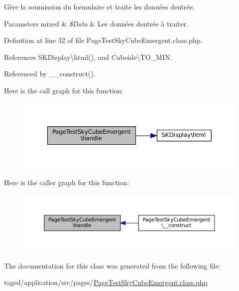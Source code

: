 Gère la soumission du formulaire et traite les données d\textquotesingle{}entrée.


\begin{DoxyParams}[1]{Parameters}
mixed & {\em \$\+Data} & Les données d\textquotesingle{}entrée à traiter. \\
\hline
\end{DoxyParams}


Definition at line 32 of file Page\+Test\+Sky\+Cube\+Emergent.\+class.\+php.



References S\+K\+Display\textbackslash{}html(), and Cuboide\textbackslash{}\+T\+O\+\_\+\+M\+IN.



Referenced by \+\_\+\+\_\+construct().

Here is the call graph for this function\+:\nopagebreak
\begin{figure}[H]
\begin{center}
\leavevmode
\includegraphics[width=350pt]{class_page_test_sky_cube_emergent_ae647129c2df8c0183927f0eaecd3a690_cgraph}
\end{center}
\end{figure}
Here is the caller graph for this function\+:\nopagebreak
\begin{figure}[H]
\begin{center}
\leavevmode
\includegraphics[width=350pt]{class_page_test_sky_cube_emergent_ae647129c2df8c0183927f0eaecd3a690_icgraph}
\end{center}
\end{figure}


The documentation for this class was generated from the following file\+:\begin{DoxyCompactItemize}
\item 
taged/application/src/pages/\hyperlink{_page_test_sky_cube_emergent_8class_8php}{Page\+Test\+Sky\+Cube\+Emergent.\+class.\+php}\end{DoxyCompactItemize}
